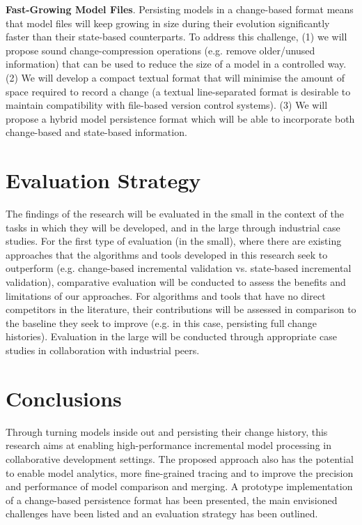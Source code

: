 \textbf{Fast-Growing Model Files}. Persisting models in a change-based format means that model files will keep growing in size during their evolution significantly faster than their state-based counterparts. To address this challenge, (1) we will propose sound change-compression operations (e.g. remove older/unused information) that can be used to reduce the size of a model in a controlled way. (2) We will develop a compact textual format that will minimise the amount of space required to record a change (a textual line-separated format is desirable to maintain compatibility with file-based version control systems). (3) We will propose a hybrid model persistence format which will be able to incorporate both change-based and state-based information. 

\section{Evaluation Strategy}
\label{sec:evaluation_strategy}
The findings of the research will be evaluated in the small in the context of the tasks in which they will be developed, and in the large through industrial case studies. For the first type of evaluation (in the small), where there are existing approaches that the algorithms and tools developed in this research seek to outperform (e.g. change-based incremental validation vs. state-based incremental validation), comparative evaluation will be conducted to assess the benefits and limitations of our approaches. For algorithms and tools that have no direct competitors in the literature, their contributions will be assessed in comparison to the baseline they seek to improve (e.g. in this case, persisting full change histories). Evaluation in the large will be conducted through appropriate case studies in collaboration with industrial peers.

\section{Conclusions}
\label{sec:conclusions}
Through turning models inside out and persisting their change history, this research aims at enabling high-performance incremental model processing in collaborative development settings. The proposed approach also has the potential to enable model analytics, more fine-grained tracing and to improve the precision and performance of model comparison and merging. A prototype implementation of a change-based persistence format has been presented, the main envisioned challenges have been listed and an evaluation strategy has been outlined. %
